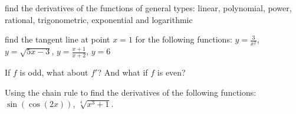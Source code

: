 \documentclass[Calculus 1 Recitation.tex]{subfiles}
\begin{document}
\begin{myleftlinebox}
	find the derivatives of the functions of general types: linear, polynomial, power, rational, trigonometric, exponential and logarithmic
	\tcblower
	\vspace{3em}
\end{myleftlinebox}

\begin{myleftlinebox}
	find the tangent line at point $x=1$ for the following functions: $y=\frac{3}{x^2}$, $y=\sqrt{5x-3}$, $y=\frac{x+1}{x+2}$, $y=6$
	\tcblower
	\vspace{3em}
\end{myleftlinebox}

\begin{myleftlinebox}
	If $f$ is odd, what about $f'$? And what if $f$ is even?
	\tcblower
	\vspace{2em}
\end{myleftlinebox}

\begin{myleftlinebox}
	Using the chain rule to find the derivatives of the following functions: $\sin(\cos(2x))$, $\sqrt[4]{x^3+1}$.
	\tcblower
	\vspace{2em}
\end{myleftlinebox}
\end{document}
